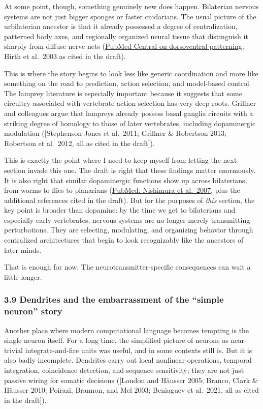 At some point, though, something genuinely new does happen. Bilaterian nervous systems are not just bigger sponges or faster cnidarians. The usual picture of the urbilaterian ancestor is that it already possessed a degree of centralization, patterned body axes, and regionally organized neural tissue that distinguish it sharply from diffuse nerve nets (\href{https://pmc.ncbi.nlm.nih.gov/articles/PMC2614231/}{PubMed Central on dorsoventral patterning}; Hirth et al.~2003 as cited in the draft).

This is where the story begins to look less like generic coordination and more like something on the road to prediction, action selection, and model-based control. The lamprey literature is especially important because it suggests that some circuitry associated with vertebrate action selection has very deep roots. Grillner and colleagues argue that lampreys already possess basal ganglia circuits with a striking degree of homology to those of later vertebrates, including dopaminergic modulation ({[}Stephenson-Jones et al.~2011; Grillner \& Robertson 2013; Robertson et al.~2012, all as cited in the draft{]}).

This is exactly the point where I need to keep myself from letting the next section invade this one. The draft is right that these findings matter enormously. It is also right that similar dopaminergic functions show up across bilaterians, from worms to flies to planarians (\href{https://pubmed.ncbi.nlm.nih.gov/17565705/}{PubMed: Nishimura et al.~2007}, plus the additional references cited in the draft). But for the purposes of \emph{this} section, the key point is broader than dopamine: by the time we get to bilaterians and especially early vertebrates, nervous systems are no longer merely transmitting perturbations. They are selecting, modulating, and organizing behavior through centralized architectures that begin to look recognizably like the ancestors of later minds.

That is enough for now. The neurotransmitter-specific consequences can wait a little longer.

\subsubsection{3.9 Dendrites and the embarrassment of the ``simple neuron'' story}\label{03_it_started-dendrites-and-the-embarrassment-of-the-simple-neuron-story}

Another place where modern computational language becomes tempting is the single neuron itself. For a long time, the simplified picture of neurons as near-trivial integrate-and-fire units was useful, and in some contexts still is. But it is also badly incomplete. Dendrites carry out local nonlinear operations, temporal integration, coincidence detection, and sequence sensitivity; they are not just passive wiring for somatic decisions ({[}London and Häusser 2005; Branco, Clark \& Häusser 2010; Poirazi, Brannon, and Mel 2003; Beniaguev et al.~2021, all as cited in the draft{]}).

